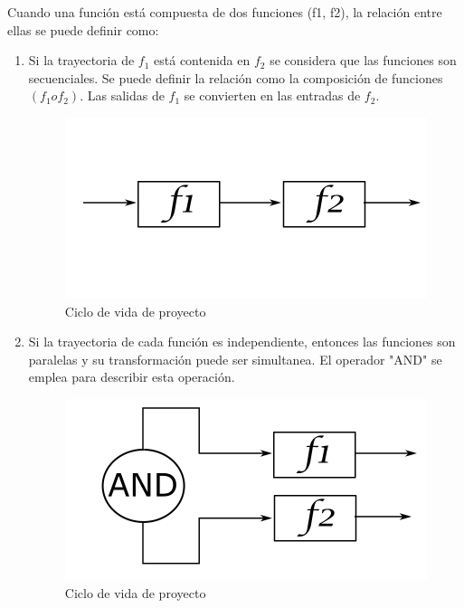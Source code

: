 Cuando una función está compuesta de dos funciones (f1, f2), la relación entre ellas se puede definir como:
\begin{enumerate}
    \item Si la trayectoria de \( f_{1} \) está contenida en \( f_{2} \) se considera que las funciones son secuenciales. Se puede definir la relación como la composición de funciones \( (f_{1} o f_{2}) \). Las salidas de \( f_{1} \) se convierten en las entradas de \( f_{2} \).
        
    \begin{figure}[h!]
        \centering
            \includegraphics[scale=0.25]{Proyecto Integrador Figuras/12 Funcion Secuencial.png}
            \caption{Ciclo de vida de proyecto}
     \end{figure}
        
    \item Si la trayectoria de cada función es independiente, entonces las funciones son paralelas y su transformación puede ser simultanea. El operador "AND" se emplea para describir esta operación.
    
    \begin{figure}[h!]
        \centering
            \includegraphics[scale=0.25]{Proyecto Integrador Figuras/13 Funcion AND.png}
            \caption{Ciclo de vida de proyecto}
     \end{figure}
    

\end{enumerate}
